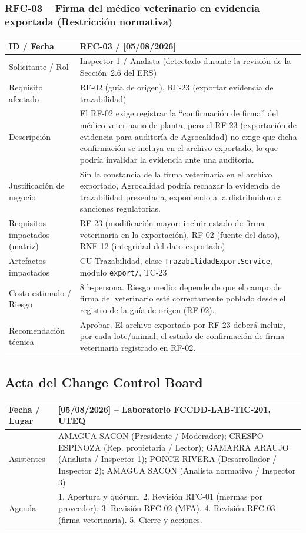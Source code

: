 \documentclass[11pt,a4paper]{article}
\begin{document}
\subsubsection*{RFC-03 -- Firma del médico veterinario en evidencia exportada (Restricción normativa)}
\begin{longtable}{|p{3.2cm}|p{9.8cm}|}
\hline
ID / Fecha & RFC-03 / [05/08/2026] \\
\hline
Solicitante / Rol & Inspector 1 / Analista (detectado durante la revisión de la Sección~2.6 del ERS) \\
\hline
Requisito afectado & RF-02 (guía de origen), RF-23 (exportar evidencia de trazabilidad) \\
\hline
Descripción & El RF-02 exige registrar la “confirmación de firma” del médico veterinario de planta, pero el RF-23 (exportación de evidencia para auditoría de Agrocalidad) no exige que dicha confirmación se incluya en el archivo exportado, lo que podría invalidar la evidencia ante una auditoría. \\
\hline
Justificación de negocio & Sin la constancia de la firma veterinaria en el archivo exportado, Agrocalidad podría rechazar la evidencia de trazabilidad presentada, exponiendo a la distribuidora a sanciones regulatorias. \\
\hline
Requisitos impactados (matriz) & RF-23 (modificación mayor: incluir estado de firma veterinaria en la exportación), RF-02 (fuente del dato), RNF-12 (integridad del dato exportado) \\
\hline
Artefactos impactados & CU-Trazabilidad, clase \texttt{TrazabilidadExportService}, módulo \texttt{export/}, TC-23 \\
\hline
Costo estimado / Riesgo & 8 h-persona. Riesgo medio: depende de que el campo de firma del veterinario esté correctamente poblado desde el registro de la guía de origen (RF-02). \\
\hline
Recomendación técnica & Aprobar. El archivo exportado por RF-23 deberá incluir, por cada lote/animal, el estado de confirmación de firma veterinaria registrado en RF-02. \\
\hline
\end{longtable}

\subsection{Acta del Change Control Board}
\begin{longtable}{|p{3.2cm}|p{9.8cm}|}
\hline
Fecha / Lugar & [05/08/2026] -- Laboratorio FCCDD-LAB-TIC-201, UTEQ \\
\hline
Asistentes & AMAGUA SACON (Presidente / Moderador); CRESPO ESPINOZA (Rep. propietaria / Lector); GAMARRA ARAUJO (Analista / Inspector 1); PONCE RIVERA (Desarrollador / Inspector 2); AMAGUA SACON (Analista normativo / Inspector 3) \\
\hline
Agenda & 1. Apertura y quórum. 2. Revisión RFC-01 (mermas por proveedor). 3. Revisión RFC-02 (MFA). 4. Revisión RFC-03 (firma veterinaria). 5. Cierre y acciones. \\
\hline
\end{longtable}
\end{document}
